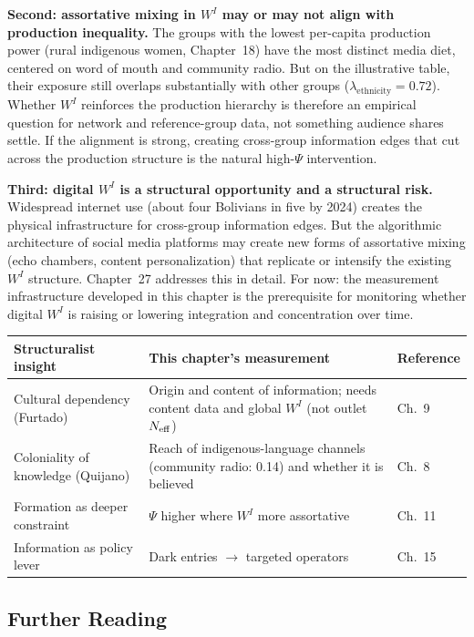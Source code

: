 \documentclass[../structural_economics_book.tex]{subfiles}
\begin{document}
\textbf{Second: assortative mixing in $W^I$ may or may not align with production inequality.} The groups with the lowest per-capita production power (rural indigenous women, Chapter~18) have the most distinct media diet, centered on word of mouth and community radio. But on the illustrative table, their exposure still overlaps substantially with other groups ($\lambda_{\text{ethnicity}} = 0.72$). Whether $W^I$ reinforces the production hierarchy is therefore an empirical question for network and reference-group data, not something audience shares settle. If the alignment is strong, creating cross-group information edges that cut across the production structure is the natural high-$\Psi$ intervention.

\textbf{Third: digital $W^I$ is a structural opportunity and a structural risk.} Widespread internet use (about four Bolivians in five by 2024) creates the physical infrastructure for cross-group information edges. But the algorithmic architecture of social media platforms may create new forms of assortative mixing (echo chambers, content personalization) that replicate or intensify the existing $W^I$ structure. Chapter~27 addresses this in detail. For now: the measurement infrastructure developed in this chapter is the prerequisite for monitoring whether digital $W^I$ is raising or lowering integration and concentration over time.

\begin{center}
\begin{tabularx}{\textwidth}{LLL}
\toprule
\textbf{Structuralist insight} & \textbf{This chapter's measurement} & \textbf{Reference} \\
\midrule
Cultural dependency (Furtado) & Origin and content of information; needs content data and global $W^I$ (not outlet $N_{\text{eff}}$) & Ch.~9 \\
Coloniality of knowledge (Quijano) & Reach of indigenous-language channels (community radio: 0.14) and whether it is believed & Ch.~8 \\
Formation as deeper constraint & $\Psi$ higher where $W^I$ more assortative & Ch.~11 \\
Information as policy lever & Dark entries $\to$ targeted operators & Ch.~15 \\
\bottomrule
\end{tabularx}
\end{center}


\subsection*{Further Reading}
\end{document}
